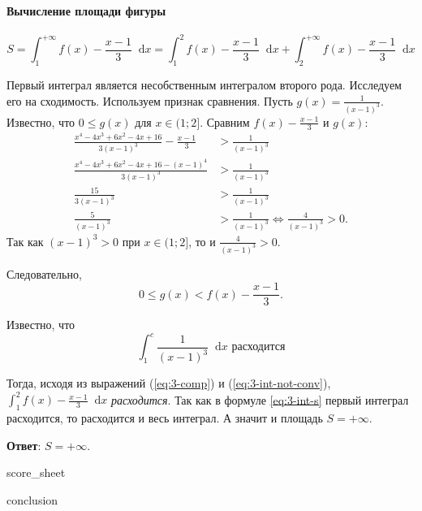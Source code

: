 \documentclass[a4paper,12pt]{article}
\newcommand*\diff{\mathop{}\!\mathrm{d}}
\begin{document}
\paragraph{Вычисление площади фигуры}
\begin{equation} \label{eq:3-int-s}
  S
  = \int_{1}^{+\infty} f(x) - \frac{x - 1}{3} \diff x
  = \int_{1}^{2} f(x) - \frac{x - 1}{3} \diff x
  + \int_{2}^{+\infty} f(x) - \frac{x - 1}{3} \diff x
\end{equation}

Первый интеграл является несобственным интегралом второго рода.
Исследуем его на сходимость.
Используем признак сравнения.
Пусть \(g(x) = \frac{1}{{(x - 1)}^3}\).
Известно, что \(0 \le g(x)\) для \(x \in (1; 2]\).
Сравним \(f(x) - \frac{x - 1}{3}\) и \(g(x)\):
\begin{align*}
  \frac{x^4 - 4 x^3 + 6 x^2 - 4 x + 16}{3 {(x - 1)}^3} - \frac{x - 1}{3}
  &> \frac{1}{{(x - 1)}^3} \\
  \frac{x^4 - 4 x^3 + 6 x^2 - 4 x + 16 - {(x - 1)}^4}{3 {(x - 1)}^3}
  &> \frac{1}{{(x - 1)}^3} \\
  \frac{15}{3 {(x - 1)}^3} &> \frac{1}{{(x - 1)}^3} \\
  \frac{5}{{(x - 1)}^3} &> \frac{1}{{(x - 1)}^3} \Leftrightarrow
  \frac{4}{{(x - 1)}^3} > 0.
\end{align*}
Так как \({(x - 1)}^3 > 0\) при \(x \in (1; 2]\),
то и \(\frac{4}{{(x - 1)}^3} > 0\).

Следовательно,
\begin{equation} \label{eq:3-comp}
  0 \le g(x) < f(x) - \frac{x - 1}{3}.
\end{equation}

Известно, что
\begin{equation} \label{eq:3-int-not-conv}
  \int_{1}^{c} \frac{1}{{(x - 1)}^3} \diff x \text{ расходится}
\end{equation}

Тогда, исходя из выражений (\ref{eq:3-comp}) и (\ref{eq:3-int-not-conv}),
\(\int_{1}^{2} f(x) - \frac{x - 1}{3} \diff x\) \textit{расходится}.
Так как в формуле \ref{eq:3-int-s} первый интеграл расходится,
то расходится и весь интеграл.
А значит и площадь \(S = +\infty\).

\textbf{Ответ}: \(S = +\infty\).

\clearpage
  {score_sheet}
\clearpage

\clearpage
  {conclusion}
\clearpage
\end{document}
